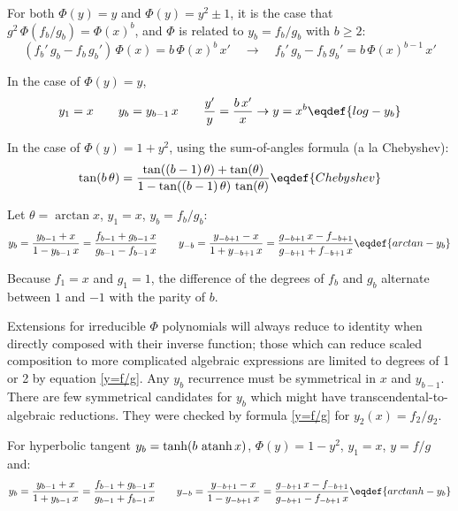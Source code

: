 For both $\Phi(y)=y$ and $\Phi(y)=y^2\pm1$, it is the case that
$g^2\,\Phi(f_b/g_b)={\Phi(x)}^b$, and $\Phi$ is related to
$y_b=f_b/g_b$ with $b\ge2$:
$$\left({f_b'\,g_b-f_b\,g_b'}\right)\,{\Phi(x)}=b\,{\Phi(x)}^b\,x'\quad\to\quad
  {f_b'\,g_b-f_b\,g_b'}=b\,{\Phi(x)}^{b-1}\,x'$$

In the case of $\Phi(y)=y$,
$$y_1=x\qquad y_{b}=y_{b-1}\,x\qquad {y'\over y}={b\,x'\over x}\to y=x^b\eqdef{log-y_b}$$

In the case of $\Phi(y)=1+y^2$, using the sum-of-angles formula (a la
Chebyshev):
$$\tan(b\,\theta)={\tan((b-1)\,\theta)+\tan(\theta)\over1-\tan((b-1)\,\theta)\,\tan(\theta)}\eqdef{Chebyshev}$$

Let $\theta=\arctan x$, $y_{1}=x$, $y_b=f_b/g_b$:
$$y_{b}={y_{b-1}+x\over1-y_{b-1}\,x}=
  {f_{b-1}+g_{b-1}\,x\over g_{b-1}-f_{b-1}\,x}\qquad
  y_{-b}={y_{-b+1}-x\over1+y_{-b+1}\,x}=
  {g_{-b+1}\,x-f_{-b+1}\over g_{-b+1}+f_{-b+1}\,x}\eqdef{arctan-y_b}$$

Because $f_{1}=x$ and $g_{1}=1$, the difference of the degrees of
$f_{b}$ and $g_{b}$ alternate between $1$ and $-1$ with the parity of
$b$.

Extensions for irreducible $\Phi$ polynomials will always reduce
to identity when directly composed with their inverse function; those
which can reduce scaled composition to more complicated algebraic
expressions are limited to degrees of 1 or 2 by
equation \eqref{y=f/g}.  Any $y_{b}$ recurrence must be symmetrical in
$x$ and $y_{b-1}$.  There are few symmetrical candidates for $y_{b}$
which might have transcendental-to-algebraic reductions.  They were
checked by formula \eqref{y=f/g} for $y_2(x)=f_2/g_2$.

For hyperbolic tangent $y_{b}=\tanh(b\,\mathop{\rm atanh}\nolimits x)$, $\Phi(y)=1-y^2$, $y_{1}=x$, $y=f/g$ and:
$$y_{b}={y_{b-1}+x\over1+y_{b-1}\,x}=
  {f_{b-1}+g_{b-1}\,x\over g_{b-1}+f_{b-1}\,x}\qquad
  y_{-b}={y_{-b+1}-x\over1-y_{-b+1}\,x}=
  {g_{-b+1}\,x-f_{-b+1}\over g_{-b+1}-f_{-b+1}\,x}\eqdef{arctanh-y_b}$$

